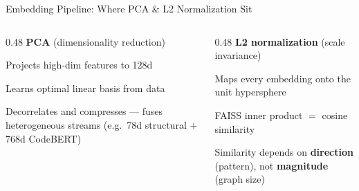 \documentclass[aspectratio=169,10pt]{beamer}
\begin{document}
\begin{frame}[fragile]{Embedding Pipeline: Where PCA \& L2 Normalization Sit}
  \vspace{0.8em}
  \begin{columns}[T]
  \begin{column}{0.48\textwidth}
    \textbf{PCA} {\small(dimensionality reduction)}
    \begin{itemize}\setlength{\itemsep}{2pt}
      {\scriptsize
      \item Projects high-dim features to 128d
      \item Learns optimal linear basis from data
      \item Decorrelates and compresses — fuses heterogeneous streams (e.g.\ 78d structural $+$ 768d CodeBERT)}
    \end{itemize}
  \end{column}
  \begin{column}{0.48\textwidth}
    \textbf{L2 normalization} {\small(scale invariance)}
    \begin{itemize}\setlength{\itemsep}{2pt}
      {\scriptsize
      \item Maps every embedding onto the unit hypersphere
      \item FAISS inner product $=$ cosine similarity
      \item Similarity depends on \textbf{direction} (pattern), not \textbf{magnitude} (graph size)}
    \end{itemize}
  \end{column}
  \end{columns}
\end{frame}
\end{document}
